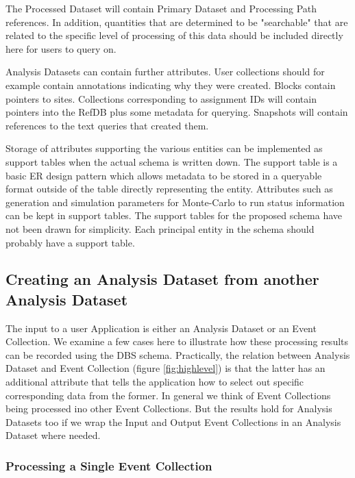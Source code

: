 \documentclass{cmspaper}
\begin{document}
The Processed Dataset will contain Primary Dataset and Processing Path 
references.
In addition, quantities that are determined to be "searchable" that are related to the 
specific level of processing of this data should be included directly here for 
users to query on.  

Analysis Datasets can contain further attributes.  User collections should for 
example contain annotations indicating why they were created.  Blocks contain 
pointers to sites.  Collections corresponding to assignment IDs will contain pointers 
into the RefDB plus some metadata for querying. Snapshots will contain references to the
text queries that created them.

Storage of attributes supporting the various 
entities  can be implemented as support tables when the actual schema is written down.  
The support table 
is a basic ER design pattern which allows metadata to be stored in a queryable format 
outside of the table directly representing the entity.  Attributes such as generation and 
simulation parameters for Monte-Carlo to run status information can be kept in support 
tables.   The support tables for the proposed schema have not been drawn for simplicity.  
Each principal entity in the schema should probably have a support table.

\subsection{Creating an Analysis Dataset from another Analysis Dataset}
\label{sec:createEvColl}

The input to a user Application is either an Analysis Dataset or an Event Collection.
We examine a few cases here to illustrate how these processing results can be 
recorded using the DBS schema.  Practically, the 
relation between Analysis Dataset and Event Collection 
(figure \ref{fig:highlevel}) is that the latter has an additional attribute that tells 
the application how to select out specific corresponding data from the former.  
In general we think of Event Collections being processed ino other Event Collections. 
But the results hold for Analysis Datasets too if we wrap the Input and Output Event Collections
in an Analysis Dataset where needed.

\subsubsection{Processing a Single Event Collection}
\end{document}

